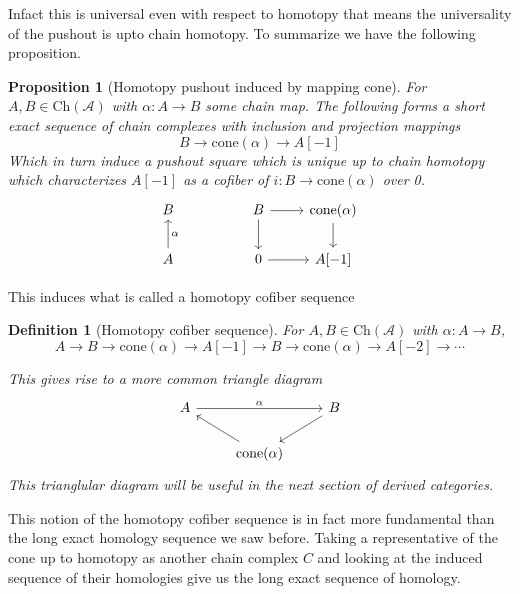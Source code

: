 \documentclass[12pt]{article}
\numberwithin{equation}{section}
\newtheorem{definition}{Definition}[section]
\newtheorem{proposition}{Proposition}[section]
\begin{document}
	Infact this is universal even with respect to homotopy that means the universality of the pushout is upto chain homotopy. To summarize we have the following proposition.
	\begin{proposition}[Homotopy pushout induced by mapping cone]
		For $A, B \in \mathrm{Ch}(\mathcal{A})$ with $\alpha: A \to B$ some chain map. The following forms a short exact sequence of chain complexes with inclusion and projection mappings
		\[ B \rightarrow \mathrm{cone}(\alpha) \rightarrow A[-1] \] 
		Which in turn induce a pushout square which is unique up to chain homotopy which characterizes $A[-1]$ as a cofiber of $i: B \to \mathrm{cone}(\alpha)$ over 0.
		\[\begin{tikzcd}
			B && B & {\mathrm{cone}(\alpha)} \\
			A && 0 & {A[-1]}
			\arrow[from=1-3, to=1-4]
			\arrow["\alpha"', from=2-1, to=1-1]
			\arrow[from=1-4, to=2-4]
			\arrow[from=1-3, to=2-3]
			\arrow[from=2-3, to=2-4]
		\end{tikzcd}\]
	\end{proposition}
	This induces what is called a homotopy cofiber sequence 
	\begin{definition}[Homotopy cofiber sequence]
			For $A, B \in \mathrm{Ch}(\mathcal{A})$ with $\alpha: A \to B$,
			\[ A \to B \to \mathrm{cone}(\alpha)\to A[-1] \to B \to \mathrm{cone}(\alpha)\to A[-2] \to \cdots \]
			
			This gives rise to a more common triangle diagram 
			\[\begin{tikzcd}
				A && B \\
				& {\mathrm{cone}(\alpha)}
				\arrow["\alpha", from=1-1, to=1-3]
				\arrow[from=1-3, to=2-2]
				\arrow[from=2-2, to=1-1]
			\end{tikzcd}\]
			This trianglular diagram will be useful in the next section of derived categories.
	\end{definition}
	This notion of the homotopy cofiber sequence is in fact more fundamental than the long exact homology sequence we saw before. Taking a representative of the cone up to homotopy as another chain complex $C$ and looking at the induced sequence of their homologies give us the long exact sequence of homology.
	
	
	
\end{document}
